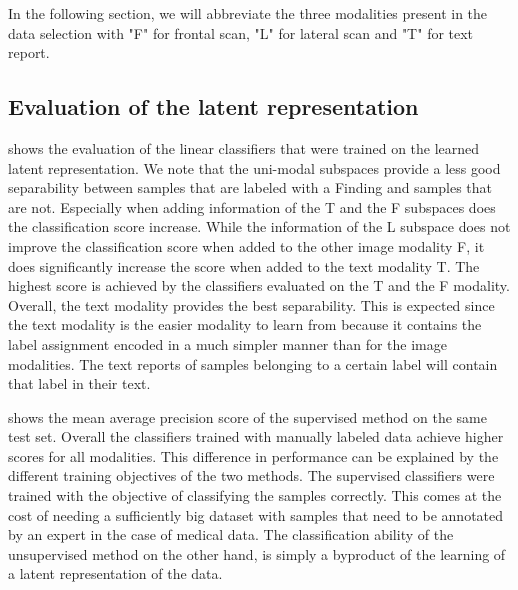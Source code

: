 \documentclass{midl} %
\begin{document}
    In the following section, we will abbreviate the three modalities present in the data selection with "F" for frontal scan, "L" for lateral scan and "T" for text report.
    
    \subsection{Evaluation of the latent representation}
    
    
    
     shows the evaluation of the linear classifiers that were trained on the learned latent representation.
    We note that the uni-modal subspaces provide a less good separability between samples that are labeled with a Finding and samples that are not.
    Especially when adding information of the T and the F subspaces does the classification score increase.
    While the information of the L subspace does not improve the classification score when added to the other image modality F, it does significantly increase the score when added to the text modality T.
    The highest score is achieved by the classifiers evaluated on the T and the F modality.
    Overall, the text modality provides the best separability.
    This is expected since the text modality is the easier modality to learn from because it contains the label assignment encoded in a much simpler manner than for the image modalities.
    The text reports of samples belonging to a certain label will contain that label in their text.
    
     shows the mean average precision score of the supervised method on the same test set.
    Overall the classifiers trained with manually labeled data achieve higher scores for all modalities.
    This difference in performance can be explained by the different training objectives of the two methods.
    The supervised classifiers were trained with the objective of classifying the samples correctly.
    This comes at the cost of needing a sufficiently big dataset with samples that need to be annotated by an expert in the case of medical data.
    The classification ability of the unsupervised method on the other hand, is simply a byproduct of the learning of a latent representation of the data.
    
    
\end{document}
